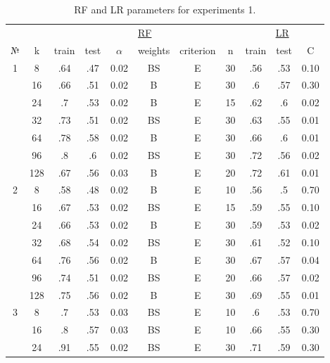 \begin{table}
\centering
\caption{RF and LR parameters for experiments 1.}
\label{tab:params_1_rf_lr}
\begin{tabular}{|c|c|cccccc||ccc|}\hline
& & \multicolumn{6}{c||}{\underline{RF}} & \multicolumn{3}{c|}{\underline{LR}}\\
№ &   k & train & test & $\alpha$ & weights & criterion &  n & train & test &    C \\\hline
1 &   8 &   .64 &  .47 &     0.02 &      BS &         E & 30 &   .56 &  .53 & 0.10 \\
  &  16 &   .66 &  .51 &     0.02 &       B &         E & 30 &    .6 &  .57 & 0.30 \\
  &  24 &    .7 &  .53 &     0.02 &       B &         E & 15 &   .62 &   .6 & 0.02 \\
  &  32 &   .73 &  .51 &     0.02 &      BS &         E & 30 &   .63 &  .55 & 0.01 \\
  &  64 &   .78 &  .58 &     0.02 &       B &         E & 30 &   .66 &   .6 & 0.01 \\
  &  96 &    .8 &   .6 &     0.02 &      BS &         E & 30 &   .72 &  .56 & 0.02 \\
  & 128 &   .67 &  .56 &     0.03 &       B &         E & 20 &   .72 &  .61 & 0.01 \\\hline
2 &   8 &   .58 &  .48 &     0.02 &       B &         E & 10 &   .56 &   .5 & 0.70 \\
  &  16 &   .67 &  .53 &     0.02 &      BS &         E & 15 &   .59 &  .55 & 0.10 \\
  &  24 &   .66 &  .53 &     0.02 &       B &         E & 30 &   .59 &  .53 & 0.02 \\
  &  32 &   .68 &  .54 &     0.02 &      BS &         E & 30 &   .61 &  .52 & 0.10 \\
  &  64 &   .76 &  .56 &     0.02 &       B &         E & 30 &   .67 &  .57 & 0.04 \\
  &  96 &   .74 &  .51 &     0.02 &      BS &         E & 20 &   .66 &  .57 & 0.02 \\
  & 128 &   .75 &  .56 &     0.02 &       B &         E & 30 &   .69 &  .55 & 0.01 \\\hline
3 &   8 &    .7 &  .53 &     0.03 &      BS &         E & 10 &    .6 &  .53 & 0.70 \\
  &  16 &    .8 &  .57 &     0.03 &      BS &         E & 10 &   .66 &  .55 & 0.30 \\
  &  24 &   .91 &  .55 &     0.02 &      BS &         E & 30 &   .71 &  .59 & 0.30 \\

\end{tabular}
\end{table}
